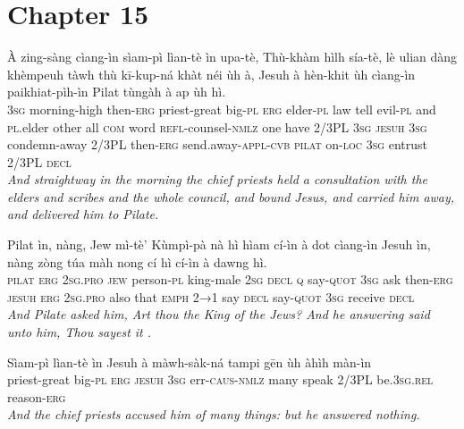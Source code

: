 \documentclass[11pt,a4paper]{article}
\begin{document}
\section*{Chapter 15}

\begin{exe}
\gll À zing-sàng cìang-ìn sìam-pì lìan-tè ìn upa-tè, Thù-khàm hìlh sía-tè, lè ulian dàng khèmpeuh tàwh thù kī-kup-ná khàt néi ùh à, Jesuh à hèn-khit ùh cìang-ìn paikhiat-pìh-ìn Pilat tùngàh à ap ùh hì. \\
     \textsc{3sg} morning-high then-\textsc{erg} priest-great big-\textsc{pl} \textsc{erg} elder-\textsc{pl} law tell evil-\textsc{pl} and \textsc{pl}.elder other all \textsc{com} word \textsc{refl}-counsel-\textsc{nmlz} one have 2/3PL \textsc{3sg} \textsc{jesuh} \textsc{3sg} condemn-away 2/3PL then-\textsc{erg} send.away-\textsc{appl}-\textsc{cvb} \textsc{pilat} on-\textsc{loc} \textsc{3sg} entrust 2/3PL \textsc{decl} \\
\glt \textcolor{kjvcolor}{\textit{And straightway in the morning the chief priests held a consultation with the elders and scribes and the whole council, and bound Jesus, and carried him away, and delivered him to Pilate.}}

\gll Pilat ìn, nàng, Jew mì-tè' Kùmpì-pà nà hì hìam cí-ìn à dot cìang-ìn Jesuh ìn, nàng zòng túa màh nong cí hì cí-ìn à dawng hì. \\
     \textsc{pilat} \textsc{erg} \textsc{2sg}.\textsc{pro} \textsc{jew} person-\textsc{pl} king-male \textsc{2sg} \textsc{decl} \textsc{q} say-\textsc{quot} \textsc{3sg} ask then-\textsc{erg} \textsc{jesuh} \textsc{erg} \textsc{2sg}.\textsc{pro} also that \textsc{emph} \textsc{2→1} say \textsc{decl} say-\textsc{quot} \textsc{3sg} receive \textsc{decl} \\
\glt \textcolor{kjvcolor}{\textit{And Pilate asked him, Art thou the King of the Jews? And he answering said unto him, Thou sayest it .}}

\gll Sìam-pì lìan-tè ìn Jesuh à màwh-sàk-ná tampi gēn ùh àhìh màn-ìn \\
     priest-great big-\textsc{pl} \textsc{erg} \textsc{jesuh} \textsc{3sg} err-\textsc{caus}-\textsc{nmlz} many speak 2/3PL be.\textsc{3sg}.\textsc{rel} reason-\textsc{erg} \\
\glt \textcolor{kjvcolor}{\textit{And the chief priests accused him of many things: but he answered nothing.}}


\end{exe}
\end{document}
